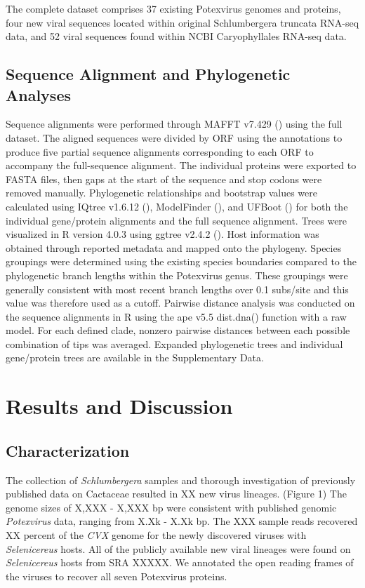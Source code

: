 \documentclass[fleqn,10pt,lineno]{wlpeerj}
\begin{document}
The complete dataset comprises 37 existing Potexvirus genomes and proteins, four new viral sequences located within original Schlumbergera truncata RNA-seq data, and 52 viral sequences found within NCBI Caryophyllales RNA-seq data.

\subsection*{Sequence Alignment and Phylogenetic Analyses}
Sequence alignments were performed through MAFFT v7.429 (\citep{katoh_mafft_2002}) using the full dataset.
The aligned sequences were divided by ORF using the annotations to produce five partial sequence alignments corresponding to each ORF to accompany the full-sequence alignment. 
The individual proteins were exported to FASTA files, then gaps at the start of the sequence and stop codons were removed manually. 
Phylogenetic relationships and bootstrap values were calculated using IQtree v1.6.12 (\citep{nguyen2015}), ModelFinder (\citep{kalyaanamoorthy_modelfinder_2017}), and UFBoot (\citep{hoang_ufboot2_2018}) for both the individual gene/protein alignments and the full sequence alignment. 
Trees were visualized in R version 4.0.3 using ggtree v2.4.2 (\citep{r,yu_ggtree_2017}). 
Host information was obtained through reported metadata and mapped onto the phylogeny. 
Species groupings were determined using the existing species boundaries compared to the phylogenetic branch lengths within the Potexvirus genus. 
These groupings were generally consistent with most recent branch lengths over 0.1 subs/site and this value was therefore used as a cutoff. 
Pairwise distance analysis was conducted on the sequence alignments in R using the ape v5.5  dist.dna() function with a raw model. 
For each defined clade, nonzero pairwise distances between each possible combination of tips was averaged. 
Expanded phylogenetic trees and individual gene/protein trees are available in the Supplementary Data.




\section*{Results and Discussion}
\subsection*{Characterization}
The collection of \textit{Schlumbergera} samples and thorough investigation of previously published data on Cactaceae resulted in XX new virus lineages. (Figure 1)
The genome sizes of X,XXX - X,XXX bp were consistent with published genomic \textit{Potexvirus} data, ranging from X.Xk - X.Xk bp.
The XXX sample reads recovered XX percent of the \textit{CVX} genome for the newly discovered viruses with \textit{Selenicereus} hosts. 
All of the publicly available new viral lineages were found on \textit{Selenicereus} hosts from SRA XXXXX.
We annotated the open reading frames of the viruses to recover all seven Potexvirus proteins.
\end{document}
